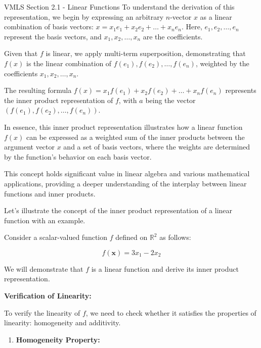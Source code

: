 \begin{notes}{VMLS Section 2.1 - Linear Functions}
    To understand the derivation of this representation, we begin by expressing an arbitrary \(n\)-vector \(x\) as a linear combination of basis vectors: \(x = x_1e_1 + x_2e_2 + \ldots + x_ne_n\). Here, \(e_1, e_2, \ldots, e_n\) 
    represent the basis vectors, and \(x_1, x_2, \ldots, x_n\) are the coefficients.
    
    Given that \(f\) is linear, we apply multi-term superposition, demonstrating that \(f(x)\) is the linear combination of \(f(e_1), f(e_2), \ldots, f(e_n)\), weighted by the coefficients \(x_1, x_2, \ldots, x_n\).
    
    The resulting formula \(f(x) = x_1f(e_1) + x_2f(e_2) + \ldots + x_nf(e_n)\) represents the inner product representation of \(f\), with \(a\) being the vector \((f(e_1), f(e_2), \ldots, f(e_n))\).
    
    In essence, this inner product representation illustrates how a linear function \(f(x)\) can be expressed as a weighted sum of the inner products between the argument vector \(x\) and a set of basis vectors, where the weights 
    are determined by the function's behavior on each basis vector.
    
    This concept holds significant value in linear algebra and various mathematical applications, providing a deeper understanding of the interplay between linear functions and inner products.

    \begin{highlight}
        Let's illustrate the concept of the inner product representation of a linear function with an example.
        
        
        Consider a scalar-valued function \(f\) defined on \(\mathbb{R}^2\) as follows:
        
        \[
        f(\mathbf{x}) = 3x_1 - 2x_2
        \]
        
        We will demonstrate that \(f\) is a linear function and derive its inner product representation.
        
        \vspace*{1em} \textbf{Verification of Linearity:} \vspace*{1em}
        
        To verify the linearity of \(f\), we need to check whether it satisfies the properties of linearity: homogeneity and additivity.
        
        \begin{enumerate}
            \item \textbf{Homogeneity Property:}
            

\end{enumerate}
\end{highlight}
\end{notes}
